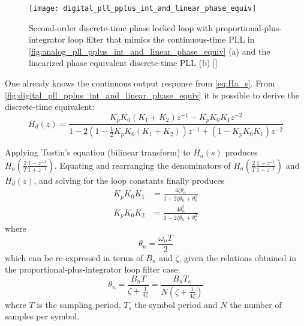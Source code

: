 \begin{figure}[H]
  \centering
  \texttt{[image: digital\_pll\_pplus\_int\_and\_linear\_phase\_equiv]}
  \caption{Second-order discrete-time phase locked loop with proportional-plus-integrator loop filter  that mimics the continuous-time PLL in \autoref{fig:analog_pll_pplus_int_and_linear_phase_equiv} (a) and the linearized phase equivalent discrete-time PLL (b) [\citeauthor{digcomm_discrete_approach}]}
  \label{fig:digital_pll_pplus_int_and_linear_phase_equiv}
\end{figure}

One already knows the continuous output response from \eqref{eq:Ha_s}. From \autoref{fig:digital_pll_pplus_int_and_linear_phase_equiv} it is possible to derive the discrete-time equivalent:
\begin{equation}H_d(z)=\frac{K_p K_0 (K_1+K_2)z^{-1}-K_p K_0 K_1 z^{-2}}{1-2\left(1-\frac{1}{2}K_p K_0 \left(K_1+K_2\right)
\right)z^{-1}+\left(1-K_p K_0 K_1 \right)z^{-2}}\end{equation}

Applying Tustin's equation (bilinear transform) to $H_a(s)$ produces $H_a\left(\frac{2}{T}\frac{1-z^{-1}}{1+z^{-1}}\right)$. Equating and rearranging the denominators of $H_a\left(\frac{2}{T}\frac{1-z^{-1}}{1+z^{-1}}\right)$ and $H_d(z)$, and solving for the loop constants finally produces
\begin{align}
K_p K_0 K_1 &= \frac{4\zeta\theta_n}{1+2\zeta\theta_n+\theta_n^2}\\
K_p K_0 K_2 &= \frac{4\theta_n^2}{1+2\zeta\theta_n+\theta_n^2}
\end{align}
where
\begin{equation}\theta_n=\frac{\omega_n T}{2}\end{equation}
which can be re-expressed in terms of $B_n$ and $\zeta$, given the relations obtained in the proportional-plus-integrator loop filter case:
\begin{equation}\theta_n=\frac{B_n T}{\zeta+\frac{1}{4\zeta}}=\frac{B_n T_s}{N\left(\zeta+\frac{1}{4\zeta}\right)}\end{equation}
where $T$ is the sampling period, $T_s$ the symbol period and $N$ the number of samples per symbol.

